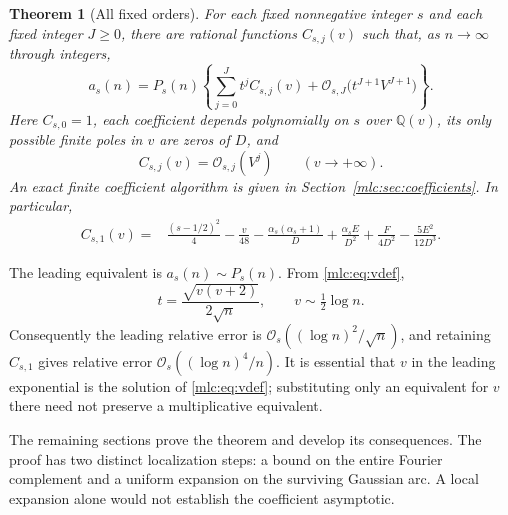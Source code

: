 \documentclass[11pt]{article}
\newtheorem{theorem}{Theorem}[section]
\theoremstyle{remark}\newtheorem{remark}[theorem]{Remark}
\newcommand{\OO}{\mathcal O}
\begin{document}
\begin{theorem}[All fixed orders]\label{mlc:thm:all}
For each fixed nonnegative integer $s$ and each fixed integer $J\ge0$, there are rational functions $C_{s,j}(v)$ such that, as $n\to\infty$ through integers,
\begin{equation}\label{mlc:eq:main}
 a_s(n)=P_s(n)\left\{\sum_{j=0}^{J}t^j C_{s,j}(v)
             +\OO_{s,J}\bigl(t^{J+1}V^{J+1}\bigr)\right\}.
\end{equation}
Here $C_{s,0}=1$, each coefficient depends polynomially on $s$ over $\mathbb Q(v)$, its only possible finite poles in $v$ are zeros of $D$, and
\begin{equation}\label{mlc:eq:Cgrowth}
 C_{s,j}(v)=\OO_{s,j}(V^j)\qquad(v\to+\infty).
\end{equation}
An exact finite coefficient algorithm is given in Section~\ref{mlc:sec:coefficients}. In particular,
\begin{align}
 C_{s,1}(v)={}&\frac{(s-1/2)^2}{4}-\frac v{48}
 -\frac{\alpha_s(\alpha_s+1)}D+\frac{\alpha_s E}{D^2}
 +\frac F{4D^2}-\frac{5E^2}{12D^3}.\label{mlc:eq:C1}
\end{align}
\end{theorem}

The leading equivalent is $a_s(n)\sim P_s(n)$. From \eqref{mlc:eq:vdef},
\begin{equation}\label{mlc:eq:tscale}
 t=\frac{\sqrt{v(v+2)}}{2\sqrt n},\qquad
 v\sim\tfrac12\log n.
\end{equation}
Consequently the leading relative error is $\OO_s((\log n)^2/\sqrt n)$, and retaining $C_{s,1}$ gives relative error $\OO_s((\log n)^4/n)$. It is essential that $v$ in the leading exponential is the solution of \eqref{mlc:eq:vdef}; substituting only an equivalent for $v$ there need not preserve a multiplicative equivalent.

The remaining sections prove the theorem and develop its consequences. The proof has two distinct localization steps: a bound on the entire Fourier complement and a uniform expansion on the surviving Gaussian arc. A local expansion alone would not establish the coefficient asymptotic.
\end{document}
